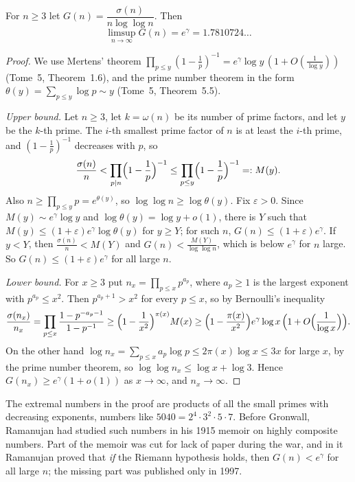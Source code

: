 \begin{theorem}[Gronwall, 1913]\label{conjectures:thm:gronwall}
For $n\ge3$ let $G(n)=\dfrac{\sigma(n)}{n\log\log n}$. Then
\[
\limsup_{n\to\infty}G(n)=e^\gamma=1.7810724\ldots
\]
\end{theorem}
\begin{proof}
We use Mertens' theorem $\prod_{p\le y}(1-\frac1p)^{-1}=e^\gamma\log y\,(1+O(\frac1{\log y}))$ (Tome~5, Theorem~1.6), and the prime number theorem in the
form $\theta(y)=\sum_{p\le y}\log p\sim y$ (Tome~5, Theorem~5.5).

\emph{Upper bound.} Let $n\ge3$, let $k=\omega(n)$ be its number of prime factors, and let $y$ be the $k$-th prime. The $i$-th smallest prime factor of $n$
is at least the $i$-th prime, and $(1-\frac1p)^{-1}$ decreases with $p$, so
\[
\frac{\sigma(n)}n<\prod_{p\mid n}\Bigl(1-\frac1p\Bigr)^{-1}\le\prod_{p\le y}\Bigl(1-\frac1p\Bigr)^{-1}=:M(y).
\]
Also $n\ge\prod_{p\le y}p=e^{\theta(y)}$, so $\log\log n\ge\log\theta(y)$. Fix $\varepsilon>0$. Since $M(y)\sim e^\gamma\log y$ and $\log\theta(y)=\log y+o(1)$,
there is $Y$ such that $M(y)\le(1+\varepsilon)e^\gamma\log\theta(y)$ for $y\ge Y$; for such $n$, $G(n)\le(1+\varepsilon)e^\gamma$. If $y<Y$, then
$\frac{\sigma(n)}n<M(Y)$ and $G(n)<\frac{M(Y)}{\log\log n}$, which is below $e^\gamma$ for $n$ large. So $G(n)\le(1+\varepsilon)e^\gamma$ for all large $n$.

\emph{Lower bound.} For $x\ge3$ put $n_x=\prod_{p\le x}p^{a_p}$, where $a_p\ge1$ is the largest exponent with $p^{a_p}\le x^2$. Then $p^{a_p+1}>x^2$ for every
$p\le x$, so by Bernoulli's inequality
\[
\frac{\sigma(n_x)}{n_x}=\prod_{p\le x}\frac{1-p^{-a_p-1}}{1-p^{-1}}\ge\Bigl(1-\frac1{x^2}\Bigr)^{\pi(x)}M(x)\ge\Bigl(1-\frac{\pi(x)}{x^2}\Bigr)e^\gamma\log x\,\Bigl(1+O\Bigl(\frac1{\log x}\Bigr)\Bigr).
\]
On the other hand $\log n_x=\sum_{p\le x}a_p\log p\le2\pi(x)\log x\le3x$ for large $x$, by the prime number theorem, so $\log\log n_x\le\log x+\log3$.
Hence $G(n_x)\ge e^\gamma(1+o(1))$ as $x\to\infty$, and $n_x\to\infty$.
\end{proof}

The extremal numbers in the proof are products of all the small primes with decreasing exponents, numbers like $5040=2^4\cdot3^2\cdot5\cdot7$. Before
Gronwall, Ramanujan had studied such numbers in his 1915 memoir on highly composite numbers. Part of the memoir was cut for lack of paper during the war,
and in it Ramanujan proved that \emph{if} the Riemann hypothesis holds, then $G(n)<e^\gamma$ for all large $n$; the missing part was published only in
1997.

